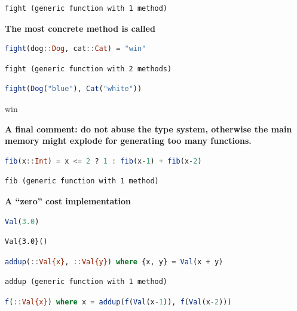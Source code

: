 \documentclass[
  notoc %
]{tufte-book}
\begin{document}
\begin{lstlisting}[language=Output]
fight (generic function with 1 method)
\end{lstlisting}

\textbf{The most concrete method is called}

\begin{lstlisting}[language=Julia]
fight(dog::Dog, cat::Cat) = "win"
\end{lstlisting}

\begin{lstlisting}[language=Output]
fight (generic function with 2 methods)
\end{lstlisting}

\begin{lstlisting}[language=Julia]
fight(Dog("blue"), Cat("white"))
\end{lstlisting}

win

\textbf{A final comment: do not abuse the type system, otherwise the
main memory might explode for generating too many functions.}

\begin{lstlisting}[language=Julia]
fib(x::Int) = x <= 2 ? 1 : fib(x-1) + fib(x-2)
\end{lstlisting}

\begin{lstlisting}[language=Output]
fib (generic function with 1 method)
\end{lstlisting}

\textbf{A ``zero'' cost implementation}

\begin{lstlisting}[language=Julia]
Val(3.0)
\end{lstlisting}

\begin{lstlisting}[language=Output]
Val{3.0}()
\end{lstlisting}

\begin{lstlisting}[language=Julia]
addup(::Val{x}, ::Val{y}) where {x, y} = Val(x + y)
\end{lstlisting}

\begin{lstlisting}[language=Output]
addup (generic function with 1 method)
\end{lstlisting}

\begin{lstlisting}[language=Julia]
f(::Val{x}) where x = addup(f(Val(x-1)), f(Val(x-2)))
\end{lstlisting}
\end{document}

